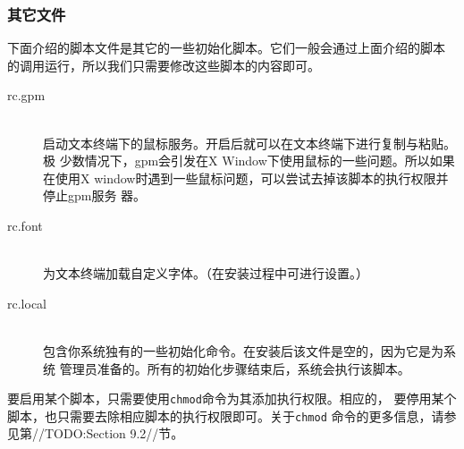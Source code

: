 \subsubsection{其它文件}
\label{sec:systemConfig:systemOverview:etcRcd:otherFiles}
下面介绍的脚本文件是其它的一些初始化脚本。它们一般会通过上面介绍的脚本
的调用运行，所以我们只需要修改这些脚本的内容即可。
\begin{description}
\item[rc.gpm] \hfill \\
  启动文本终端下的鼠标服务。开启后就可以在文本终端下进行复制与粘贴。极
  少数情况下，gpm会引发在X Window下使用鼠标的一些问题。所以如果在使用X
  window时遇到一些鼠标问题，可以尝试去掉该脚本的执行权限并停止gpm服务
  器。
\item[rc.font] \hfill \\
  为文本终端加载自定义字体。（在安装过程中可进行设置。）
\item[rc.local] \hfill \\
  包含你系统独有的一些初始化命令。在安装后该文件是空的，因为它是为系统
  管理员准备的。所有的初始化步骤结束后，系统会执行该脚本。
\end{description}

要启用某个脚本，只需要使用\texttt{chmod}命令为其添加执行权限。相应的，
要停用某个脚本，也只需要去除相应脚本的执行权限即可。关于\texttt{chmod}
命令的更多信息，请参见第//TODO:Section 9.2//节。

